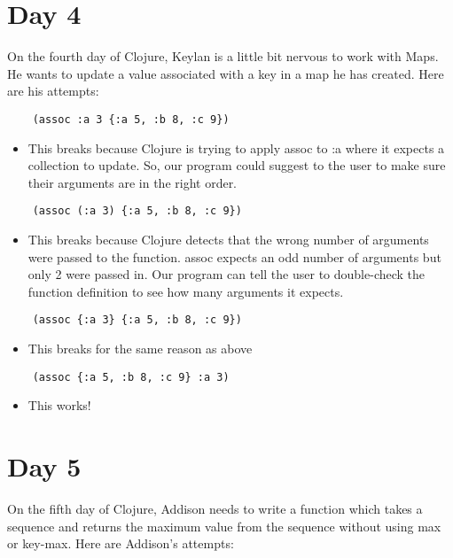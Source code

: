 \documentclass[12pt]{article}
\begin{document}
\section{Day 4}
On the fourth day of Clojure, Keylan is a little bit nervous to work with Maps. He wants to update a value associated with a key in a map he has created. Here are his attempts:
\begin{verbatim}
	(assoc :a 3 {:a 5, :b 8, :c 9})
\end{verbatim}
\begin{itemize}
	\item This breaks because Clojure is trying to apply assoc to :a where it expects a collection to update. So, our program could suggest to the user to make sure their arguments are in the right order.
\end{itemize}

\begin{verbatim}
	(assoc (:a 3) {:a 5, :b 8, :c 9})
\end{verbatim}
\begin{itemize}
	\item This breaks because Clojure detects that the wrong number of arguments were passed to the function. assoc expects an odd number of arguments but only 2 were passed in. Our program can tell the user to double-check the function definition to see how many arguments it expects.
\end{itemize}

\begin{verbatim}
	(assoc {:a 3} {:a 5, :b 8, :c 9})
\end{verbatim}
\begin{itemize}
	\item This breaks for the same reason as above
\end{itemize}

\begin{verbatim}
	(assoc {:a 5, :b 8, :c 9} :a 3)
\end{verbatim}
\begin{itemize}
	\item This works!
\end{itemize}

\section{Day 5}
On the fifth day of Clojure, Addison needs to write a function which takes a sequence and returns the maximum value from the sequence without using max or key-max. Here are Addison's attempts:
\end{document}
